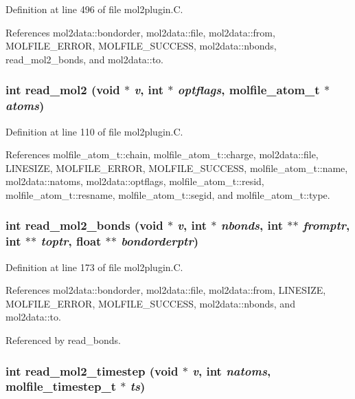 Definition at line 496 of file mol2plugin.C.

References mol2data::bondorder, mol2data::file, mol2data::from, MOLFILE\_\-ERROR, MOLFILE\_\-SUCCESS, mol2data::nbonds, read\_\-mol2\_\-bonds, and mol2data::to.
\subsubsection{\setlength{\rightskip}{0pt plus 5cm}int read\_\-mol2 (void $\ast$ {\em v}, int $\ast$ {\em optflags}, {\bf molfile\_\-atom\_\-t} $\ast$ {\em atoms})\hspace{0.3cm}{\tt  [static]}}\label{mol2plugin_8C_a3}




Definition at line 110 of file mol2plugin.C.

References molfile\_\-atom\_\-t::chain, molfile\_\-atom\_\-t::charge, mol2data::file, LINESIZE, MOLFILE\_\-ERROR, MOLFILE\_\-SUCCESS, molfile\_\-atom\_\-t::name, mol2data::natoms, mol2data::optflags, molfile\_\-atom\_\-t::resid, molfile\_\-atom\_\-t::resname, molfile\_\-atom\_\-t::segid, and molfile\_\-atom\_\-t::type.
\subsubsection{\setlength{\rightskip}{0pt plus 5cm}int read\_\-mol2\_\-bonds (void $\ast$ {\em v}, int $\ast$ {\em nbonds}, int $\ast$$\ast$ {\em fromptr}, int $\ast$$\ast$ {\em toptr}, float $\ast$$\ast$ {\em bondorderptr})\hspace{0.3cm}{\tt  [static]}}\label{mol2plugin_8C_a4}




Definition at line 173 of file mol2plugin.C.

References mol2data::bondorder, mol2data::file, mol2data::from, LINESIZE, MOLFILE\_\-ERROR, MOLFILE\_\-SUCCESS, mol2data::nbonds, and mol2data::to.

Referenced by read\_\-bonds.
\subsubsection{\setlength{\rightskip}{0pt plus 5cm}int read\_\-mol2\_\-timestep (void $\ast$ {\em v}, int {\em natoms}, {\bf molfile\_\-timestep\_\-t} $\ast$ {\em ts})\hspace{0.3cm}{\tt  [static]}}\label{mol2plugin_8C_a5}




